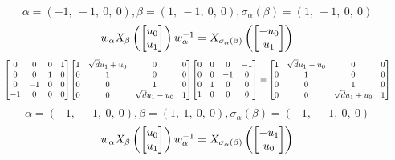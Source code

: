 \documentclass[11pt]{article}
\theoremstyle{definition}
\begin{document}
\[
\alpha = \left( -1, \  -1, \  0, \  0\right), \beta = \left( 1, \  -1, \  0, \  0\right), \sigma_{\alpha}(\beta) = \left( 1, \  -1, \  0, \  0\right)
\]
\[
\scaletoalign{\textwidth}{w_{\alpha} X_{\beta}\left(\left[\begin{matrix}u_{0}\\u_{1}\end{matrix}\right]\right) w_{\alpha}^{-1} = X_{\sigma_{\alpha}\left(\beta\right)}\left(\left[\begin{matrix}- u_{0}\\u_{1}\end{matrix}\right]\right)}
\]
\[
\scaletoalign{\textwidth}{{\left[\begin{matrix}0 & 0 & 0 & 1\\0 & 0 & 1 & 0\\0 & -1 & 0 & 0\\-1 & 0 & 0 & 0\end{matrix}\right]} {\left[\begin{matrix}1 & \sqrt{d} u_{1} + u_{0} & 0 & 0\\0 & 1 & 0 & 0\\0 & 0 & 1 & 0\\0 & 0 & \sqrt{d} u_{1} - u_{0} & 1\end{matrix}\right]} {\left[\begin{matrix}0 & 0 & 0 & -1\\0 & 0 & -1 & 0\\0 & 1 & 0 & 0\\1 & 0 & 0 & 0\end{matrix}\right]} = {\left[\begin{matrix}1 & \sqrt{d} u_{1} - u_{0} & 0 & 0\\0 & 1 & 0 & 0\\0 & 0 & 1 & 0\\0 & 0 & \sqrt{d} u_{1} + u_{0} & 1\end{matrix}\right]}}
\]
\[
\alpha = \left( -1, \  -1, \  0, \  0\right), \beta = \left( 1, \  1, \  0, \  0\right), \sigma_{\alpha}(\beta) = \left( -1, \  -1, \  0, \  0\right)
\]
\[
\scaletoalign{\textwidth}{w_{\alpha} X_{\beta}\left(\left[\begin{matrix}u_{0}\\u_{1}\end{matrix}\right]\right) w_{\alpha}^{-1} = X_{\sigma_{\alpha}\left(\beta\right)}\left(\left[\begin{matrix}- u_{1}\\u_{0}\end{matrix}\right]\right)}
\]
\end{document}
